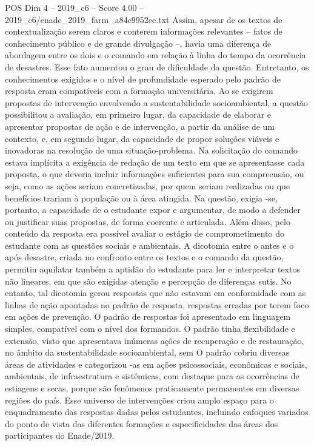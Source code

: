 \begin{textsample}{POS Dim 4 – 2019\_c6 – Score 4.00 – 2019\_c6/enade\_2019\_farm\_a84c9952ee.txt}
Assim, apesar de os textos de contextualização serem claros e conterem informações relevantes – fatos de conhecimento público e de grande divulgação –, havia uma diferença de abordagem entre os dois e o comando em relação à linha do tempo da ocorrência de desastres.
Esse fato aumentou o grau de dificuldade da questão.
Entretanto, os conhecimentos exigidos e o nível de profundidade esperado pelo padrão de resposta eram compatíveis com a formação universitária.
Ao se exigirem propostas de intervenção envolvendo a sustentabilidade socioambiental, a questão possibilitou a avaliação, em primeiro lugar, da capacidade de elaborar e apresentar propostas de ação e de intervenção, a partir da análise de um contexto, e, em segundo lugar, da capacidade de propor soluções viáveis e inovadoras na resolução de uma situação-problema.
Na solicitação do comando estava implícita a exigência de redação de um texto em que se apresentasse cada proposta, o que deveria incluir informações suficientes para sua compreensão, ou seja, como as ações seriam concretizadas, por quem seriam realizadas ou que benefícios trariam à população ou à área atingida.
Na questão, exigia -se, portanto, a capacidade de o estudante expor e argumentar, de modo a defender ou justificar suas propostas, de forma coerente e articulada.
Além disso, pelo conteúdo da resposta era possível avaliar o estágio de comprometimento do estudante com as questões sociais e ambientais.
A dicotomia entre o antes e o após desastre, criada no confronto entre os textos e o comando da questão, permitiu aquilatar também a aptidão do estudante para ler e interpretar textos não lineares, em que são exigidas atenção e percepção de diferenças sutis.
No entanto, tal dicotomia gerou respostas que não estavam em conformidade com as linhas de ação apontadas no padrão de resposta, respostas erradas por terem foco em ações de prevenção.
O padrão de respostas foi apresentado em linguagem simples, compatível com o nível dos formandos.
O padrão tinha flexibilidade e extensão, visto que apresentava inúmeras ações de recuperação e de restauração, no âmbito da sustentabilidade socioambiental, sem O padrão cobriu diversas áreas de atividades e categorizou -as em ações psicossociais, econômicas e sociais, ambientais, de infraestrutura e sistêmicas, com destaque para as ocorrências de estiagens e secas, porque são fenômenos praticamente permanentes em diversas regiões do país.
Esse universo de intervenções criou amplo espaço para o enquadramento das respostas dadas pelos estudantes, incluindo enfoques variados do ponto de vista das diferentes formações e especificidades das áreas dos participantes do Enade/2019.

\end{textsample}
